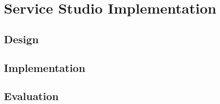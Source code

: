 









\section{Service Studio Implementation}
\label{sec:service_studio_implementation}

\subsection{Design}
\label{subsec:service_studio_design}


\subsection{Implementation}
\label{subsec:service_studio_implementation}

\subsection{Evaluation}
\label{subsec:service_studio_evaluation}

